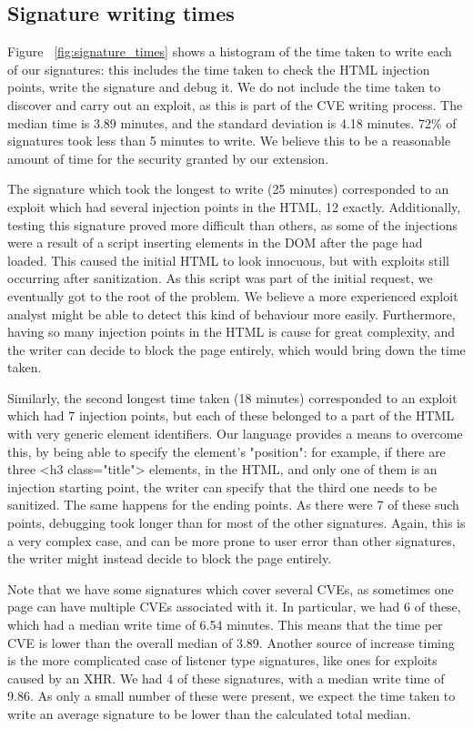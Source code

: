 \subsection{Signature writing times} \label{signature_times}

Figure ~\ref{fig:signature_times} shows a histogram of the time taken to write each of our signatures: this includes the time taken to check the HTML injection points, write the signature and debug it. We do not include the time taken to discover and carry out an exploit, as this is part of the CVE writing process. The median time is 3.89 minutes, and the standard deviation is 4.18 minutes. 72\% of signatures took less than 5 minutes to write. We believe this to be a reasonable amount of time for the security granted by our extension.

The signature which took the longest to write (25 minutes) corresponded to an exploit which had several injection points in the HTML, 12 exactly. Additionally, testing this signature proved more difficult than others, as some of the injections were a result of a script inserting elements in the DOM after the page had loaded. This caused the initial HTML to look innocuous, but with exploits still occurring after sanitization. As this script was part of the initial request, we eventually got to the root of the problem. We believe a more experienced exploit analyst might be able to detect this kind of behaviour more easily. Furthermore, having so many injection points in the HTML is cause for great complexity, and the writer can decide to block the page entirely, which would bring down the time taken.

Similarly, the second longest time taken (18 minutes) corresponded to an exploit which had 7 injection points, but each of these belonged to a part of the HTML with very generic element identifiers. Our language provides a means to overcome this, by being able to specify the element's "position": for example, if there are three <h3 class="title"> elements, in the HTML, and only one of them is an injection starting point, the writer can specify that the third one needs to be sanitized. The same happens for the ending points. As there were 7 of these such points, debugging took longer than for most of the other signatures. Again, this is a very complex case, and can be more prone to user error than other signatures, the writer might instead decide to block the page entirely.

Note that we have some signatures which cover several CVEs, as sometimes one page can have multiple CVEs associated with it. In particular, we had 6 of these, which had a median write time of 6.54 minutes. This means that the time per CVE is lower than the overall median of 3.89. Another source of increase timing is the more complicated case of listener type signatures, like ones for exploits caused by an XHR. We had 4 of these signatures, with a median write time of 9.86. As only a small number of these were present, we expect the time taken to write an average signature to be lower than the calculated total median.

